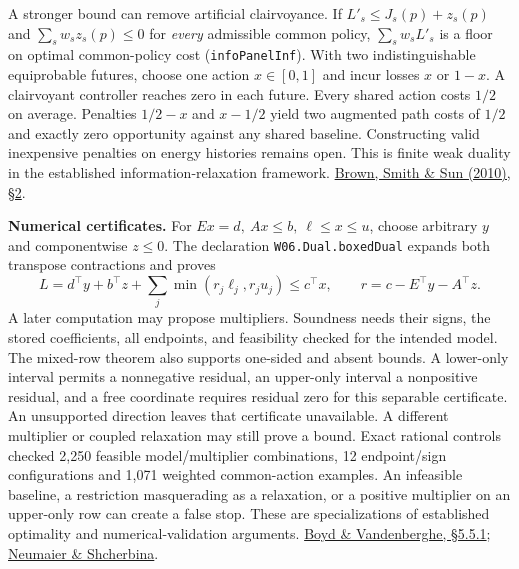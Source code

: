 \documentclass[10pt,letterpaper]{article}
\begin{document}
A stronger bound can remove artificial clairvoyance. If $L'_s\leq J_s(p)+z_s(p)$ and $\sum_s w_s z_s(p)\leq0$ for \emph{every} admissible common policy, $\sum_s w_s L'_s$ is a floor on optimal common-policy cost (\texttt{infoPanelInf}). With two indistinguishable equiprobable futures, choose one action $x\in[0,1]$ and incur losses $x$ or $1-x$. A clairvoyant controller reaches zero in each future. Every shared action costs $1/2$ on average. Penalties $1/2-x$ and $x-1/2$ yield two augmented path costs of $1/2$ and exactly zero opportunity against any shared baseline. Constructing valid inexpensive penalties on energy histories remains open. This is finite weak duality in the established information-relaxation framework. \href{https://doi.org/10.1287/opre.1090.0796}{Brown, Smith \& Sun (2010), \S2}.

\textbf{Numerical certificates.} For $Ex=d,\ Ax\leq b,\ \ell\leq x\leq u$, choose arbitrary $y$ and componentwise $z\leq0$. The declaration \texttt{W06.Dual.boxedDual} expands both transpose contractions and proves
\[
 L=d^\top y+b^\top z+\sum_j\min(r_j\ell_j,r_j u_j)\leq c^\top x,
 \qquad r=c-E^\top y-A^\top z.
\]
A later computation may propose multipliers. Soundness needs their signs, the stored coefficients, all endpoints, and feasibility checked for the intended model. The mixed-row theorem also supports one-sided and absent bounds. A lower-only interval permits a nonnegative residual, an upper-only interval a nonpositive residual, and a free coordinate requires residual zero for this separable certificate. An unsupported direction leaves that certificate unavailable. A different multiplier or coupled relaxation may still prove a bound. Exact rational controls checked 2,250 feasible model/multiplier combinations, 12 endpoint/sign configurations and 1,071 weighted common-action examples. An infeasible baseline, a restriction masquerading as a relaxation, or a positive multiplier on an upper-only row can create a false stop. These are specializations of established optimality and numerical-validation arguments. \href{https://stanford.edu/~boyd/cvxbook/bv_cvxbook.pdf}{Boyd \& Vandenberghe, \S5.5.1}; \href{https://optimization-online.org/2002/06/494/}{Neumaier \& Shcherbina}.
\end{document}
